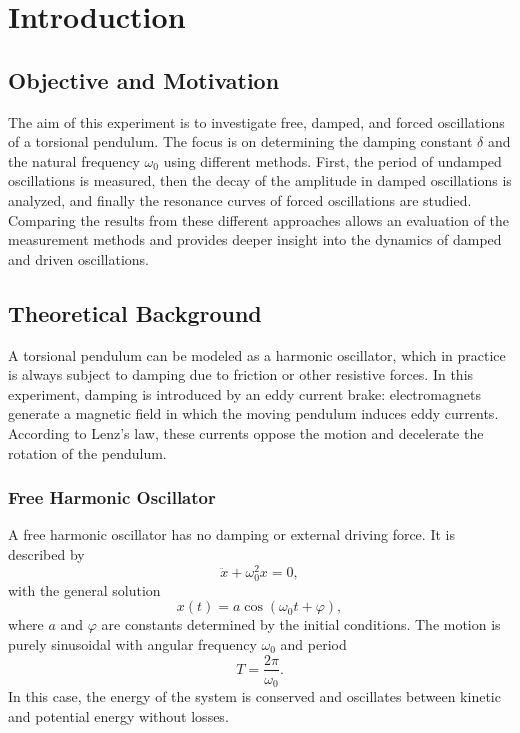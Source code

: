 \chapter{Introduction}

\section{Objective and Motivation}
The aim of this experiment is to investigate free, damped, and forced oscillations of a torsional pendulum. The focus is on determining the damping constant $\delta$ and the natural frequency $\omega_0$ using different methods. First, the period of undamped oscillations is measured, then the decay of the amplitude in damped oscillations is analyzed, and finally the resonance curves of forced oscillations are studied. Comparing the results from these different approaches allows an evaluation of the measurement methods and provides deeper insight into the dynamics of damped and driven oscillations.

\section{Theoretical Background}
A torsional pendulum can be modeled as a harmonic oscillator, which in practice is always subject to damping due to friction or other resistive forces. In this experiment, damping is introduced by an eddy current brake: electromagnets generate a magnetic field in which the moving pendulum induces eddy currents. According to Lenz’s law, these currents oppose the motion and decelerate the rotation of the pendulum.

\subsection{Free Harmonic Oscillator}
A free harmonic oscillator has no damping or external driving force. It is described by
\begin{equation}
\ddot{x} + \omega_0^2 x = 0,
\end{equation}
with the general solution
\begin{equation}
x(t) = a \cos(\omega_0 t + \varphi),
\end{equation}
where $a$ and $\varphi$ are constants determined by the initial conditions. The motion is purely sinusoidal with angular frequency $\omega_0$ and period
\begin{equation}
    T = \frac{2\pi}{\omega_0}.
    \label{eq:period_time}
\end{equation}
In this case, the energy of the system is conserved and oscillates between kinetic and potential energy without losses.

